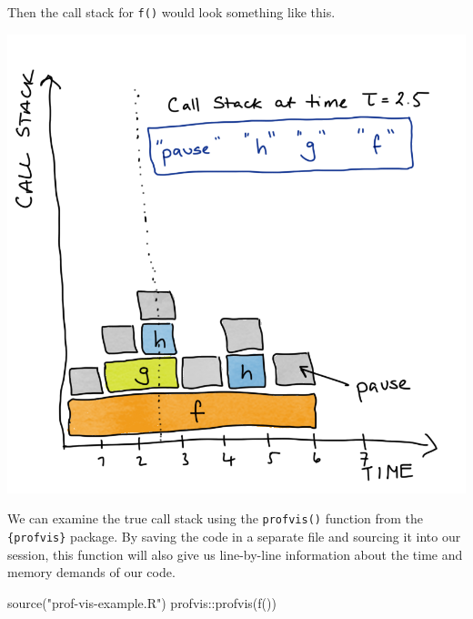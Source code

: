 \documentclass[
  12pt,
]{book}
\newenvironment{Shaded}{\begin{snugshade}}{\end{snugshade}}
\newcommand{\FunctionTok}[1]{\textcolor[rgb]{0.00,0.00,0.00}{#1}}
\newcommand{\NormalTok}[1]{#1}
\newcommand{\SpecialCharTok}[1]{\textcolor[rgb]{0.00,0.00,0.00}{#1}}
\newcommand{\StringTok}[1]{\textcolor[rgb]{0.31,0.60,0.02}{#1}}
\begin{document}
Then the call stack for \texttt{f()} would look something like this.

\includegraphics[width=12.5in]{images/403-production-scalability/call-stack}

We can examine the true call stack using the \texttt{profvis()} function from the \texttt{\{profvis\}} package. By saving the code in a separate file and sourcing it into our session, this function will also give us line-by-line information about the time and memory demands of our code.

\begin{Shaded}
\begin{Highlighting}[]
\FunctionTok{source}\NormalTok{(}\StringTok{"prof{-}vis{-}example.R"}\NormalTok{)}
\NormalTok{profvis}\SpecialCharTok{::}\FunctionTok{profvis}\NormalTok{(}\FunctionTok{f}\NormalTok{())}
\end{Highlighting}
\end{Shaded}
\end{document}
